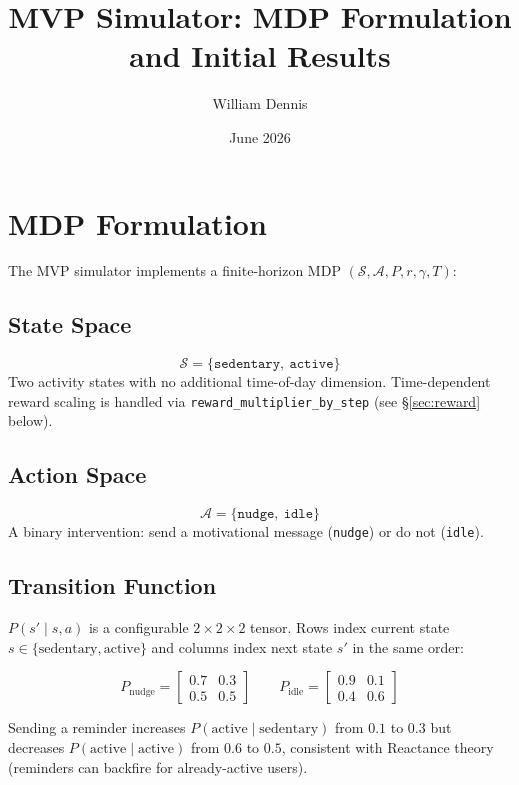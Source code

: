 \documentclass[11pt]{article}
\title{MVP Simulator: MDP Formulation and Initial Results}
\author{William Dennis}
\date{June 2026}
\begin{document}
\maketitle

\section{MDP Formulation}

The MVP simulator implements a finite-horizon MDP $(\mathcal{S}, \mathcal{A}, P, r, \gamma, T)$:

\subsection{State Space}
\[
\mathcal{S} = \{\texttt{sedentary},\ \texttt{active}\}
\]
Two activity states with no additional time-of-day dimension. Time-dependent reward scaling is handled via \texttt{reward\_multiplier\_by\_step} (see \S\ref{sec:reward} below).

\subsection{Action Space}
\[
\mathcal{A} = \{\texttt{nudge},\ \texttt{idle}\}
\]
A binary intervention: send a motivational message (\texttt{nudge}) or do not (\texttt{idle}).

\subsection{Transition Function}

$P(s' \mid s, a)$ is a configurable $2 \times 2 \times 2$ tensor. Rows index current state $s \in \{\text{sedentary}, \text{active}\}$ and columns index next state $s'$ in the same order:

\[
P_{\text{nudge}} =
\begin{bmatrix}
0.7 & 0.3 \\[2pt]
0.5 & 0.5
\end{bmatrix}
\qquad
P_{\text{idle}} =
\begin{bmatrix}
0.9 & 0.1 \\[2pt]
0.4 & 0.6
\end{bmatrix}
\]

Sending a reminder increases $P(\text{active} \mid \text{sedentary})$ from $0.1$ to $0.3$ but decreases $P(\text{active} \mid \text{active})$ from $0.6$ to $0.5$, consistent with Reactance theory (reminders can backfire for already-active users).
\end{document}
